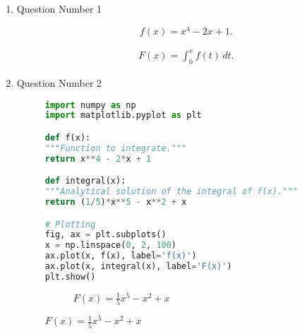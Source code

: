 \documentclass{zc-ust-hw}
\begin{document}
\maketitle

\begin{enumerate}

  \item Question Number 1

    \[
      f(x) = x^4 - 2x + 1
    .\] 
    \begin{sol}
      \begin{align}
        F(x) = \int_{0}^{x} f(t) \, dt
      .\end{align}
    \end{sol}

  \item Question Number 2

    \begin{figure}[H]
      \centering
      \begin{minipage}{0.7\textwidth}
\begin{lstlisting}[language=Python]
import numpy as np
import matplotlib.pyplot as plt

def f(x):
"""Function to integrate."""
return x**4 - 2*x + 1

def integral(x):
"""Analytical solution of the integral of f(x)."""
return (1/5)*x**5 - x**2 + x

# Plotting
fig, ax = plt.subplots()
x = np.linspace(0, 2, 100)
ax.plot(x, f(x), label='f(x)')
ax.plot(x, integral(x), label='F(x)')
plt.show()
      \end{lstlisting}
    \end{minipage}
    \hfill
    \begin{subfigure}{0.25\textwidth}
      \caption{$f(x) = x^4 - 2x + 1$}
      \vspace{1em}
      \caption{$F(x) = \frac{1}{5}x^5 - x^2 + x$}
    \end{subfigure}
  \end{figure}


\end{enumerate}
\end{document}
